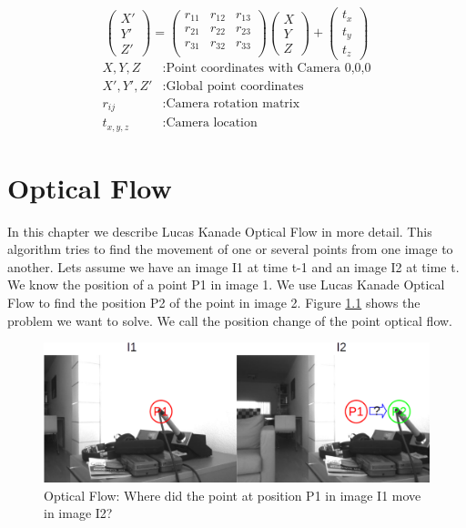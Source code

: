 \documentclass[11pt,a4paper,titlepage,oneside]{report}
\begin{document}
\begin{equation}\label{eq:depth_global}
  \begin{pmatrix}
    X'\\
    Y'\\
    Z'
  \end{pmatrix}=
  \begin{pmatrix}
    r_{11} & r_{12} & r_{13}\\
    r_{21} & r_{22} & r_{23}\\
    r_{31} & r_{32} & r_{33}\\
  \end{pmatrix}
  \begin{pmatrix}
    X\\
    Y\\
    Z
  \end{pmatrix}
  +\begin{pmatrix}
    t_x\\
    t_y\\
    t_z
  \end{pmatrix}
\end{equation}
\begin{align*}
  X,Y,Z      &: \text{Point coordinates with Camera 0,0,0}\\
  X',Y',Z'  &: \text{Global point coordinates}\\
  r_{ij}    &: \text{Camera rotation matrix}\\
  t_{x,y,z}  &: \text{Camera location}
\end{align*}

\chapter{Optical Flow}\label{ch:opt_flow}

In this chapter we describe Lucas Kanade Optical Flow in more detail. This algorithm tries to find the movement of one or several points from one image to another. Lets assume we have an image I1 at time t-1 and an image I2 at time t. We know the position of a point P1 in image 1. We use Lucas Kanade Optical Flow to find the position P2 of the point in image 2. Figure \ref{fig:optical_flow} shows the problem we want to solve. We call the position change of the point optical flow.

\begin{figure}[H]
	\includegraphics[width=1.0\textwidth]{img/optical_flow.png}
	\caption{Optical Flow: Where did the point at position P1 in image I1 move in image I2?}\label{fig:optical_flow}
\end{figure}
\end{document}
